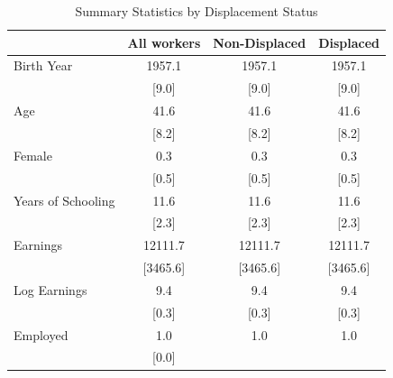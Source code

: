 \documentclass{article}
\begin{document}
\begin{table}[htbp] 
\centering 
\begin{threeparttable} 
\caption{Summary Statistics by Displacement Status} 

\centering
\begin{tabular}{llll}
\toprule
\multicolumn{1}{c}{} &
  \multicolumn{1}{r}{All workers} &
  \multicolumn{1}{r}{Non-Displaced} &
  \multicolumn{1}{r}{Displaced} \\
\midrule
\multicolumn{1}{l}{Birth Year} &
  \multicolumn{1}{c}{1957.1} &
  \multicolumn{1}{c}{1957.1} &
  \multicolumn{1}{c}{1957.1} \\
\multicolumn{1}{l}{} &
  \multicolumn{1}{c}{[9.0]} &
  \multicolumn{1}{c}{[9.0]} &
  \multicolumn{1}{c}{[9.0]} \\
\multicolumn{1}{l}{Age} &
  \multicolumn{1}{c}{41.6} &
  \multicolumn{1}{c}{41.6} &
  \multicolumn{1}{c}{41.6} \\
\multicolumn{1}{l}{} &
  \multicolumn{1}{c}{[8.2]} &
  \multicolumn{1}{c}{[8.2]} &
  \multicolumn{1}{c}{[8.2]} \\
\multicolumn{1}{l}{Female} &
  \multicolumn{1}{c}{0.3} &
  \multicolumn{1}{c}{0.3} &
  \multicolumn{1}{c}{0.3} \\
\multicolumn{1}{l}{} &
  \multicolumn{1}{c}{[0.5]} &
  \multicolumn{1}{c}{[0.5]} &
  \multicolumn{1}{c}{[0.5]} \\
\multicolumn{1}{l}{Years of Schooling} &
  \multicolumn{1}{c}{11.6} &
  \multicolumn{1}{c}{11.6} &
  \multicolumn{1}{c}{11.6} \\
\multicolumn{1}{l}{} &
  \multicolumn{1}{c}{[2.3]} &
  \multicolumn{1}{c}{[2.3]} &
  \multicolumn{1}{c}{[2.3]} \\
\multicolumn{1}{l}{Earnings} &
  \multicolumn{1}{c}{12111.7} &
  \multicolumn{1}{c}{12111.7} &
  \multicolumn{1}{c}{12111.7} \\
\multicolumn{1}{l}{} &
  \multicolumn{1}{c}{[3465.6]} &
  \multicolumn{1}{c}{[3465.6]} &
  \multicolumn{1}{c}{[3465.6]} \\
\multicolumn{1}{l}{Log Earnings} &
  \multicolumn{1}{c}{9.4} &
  \multicolumn{1}{c}{9.4} &
  \multicolumn{1}{c}{9.4} \\
\multicolumn{1}{l}{} &
  \multicolumn{1}{c}{[0.3]} &
  \multicolumn{1}{c}{[0.3]} &
  \multicolumn{1}{c}{[0.3]} \\
\multicolumn{1}{l}{Employed} &
  \multicolumn{1}{c}{1.0} &
  \multicolumn{1}{c}{1.0} &
  \multicolumn{1}{c}{1.0} \\
\multicolumn{1}{l}{} &
  \multicolumn{1}{c}{[0.0]} &

\end{tabular}
\end{threeparttable}
\end{table}
\end{document}
